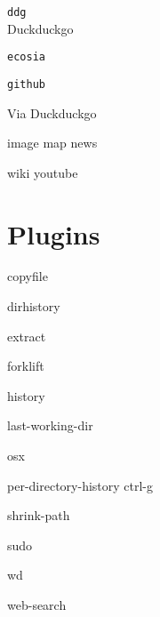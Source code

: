 \documentclass[a4paper,landscape,columns=3]{cheatsheet}
\begin{document}
\texttt{ddg}\\
Duckduckgo

\texttt{ecosia}

\texttt{github}

Via Duckduckgo

\ttfamily

image \qquad map \qquad news

wiki \qquad youtube

\columnbreak

\section{Plugins}

copyfile

dirhistory 

extract

forklift

history

last-working-dir

osx

per-directory-history {\dsm{(}}ctrl-g{\dsm{)}}

shrink-path

sudo

wd

web-search 
\end{document}

